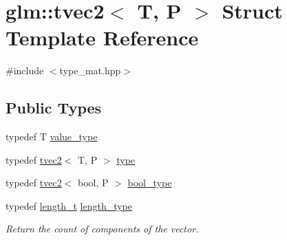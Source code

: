 \hypertarget{structglm_1_1tvec2}{}\section{glm\+::tvec2$<$ T, P $>$ Struct Template Reference}
\label{structglm_1_1tvec2}


{\ttfamily \#include $<$type\+\_\+mat.\+hpp$>$}

\subsection*{Public Types}
\begin{DoxyCompactItemize}
\item 
typedef T \mbox{\hyperlink{structglm_1_1tvec2_a45de6851b3de40183d7e35deb7cb27ab}{value\+\_\+type}}
\item 
typedef \mbox{\hyperlink{structglm_1_1tvec2}{tvec2}}$<$ T, P $>$ \mbox{\hyperlink{structglm_1_1tvec2_a387f2c68c61e26e75bbe3d67ee878f41}{type}}
\item 
typedef \mbox{\hyperlink{structglm_1_1tvec2}{tvec2}}$<$ bool, P $>$ \mbox{\hyperlink{structglm_1_1tvec2_add34b9138a842221f63186e25378d92e}{bool\+\_\+type}}
\item 
typedef \mbox{\hyperlink{namespaceglm_a090a0de2260835bee80e71a702492ed9}{length\+\_\+t}} \mbox{\hyperlink{structglm_1_1tvec2_a5a5ddebab821a3cf9185772386afbe8d}{length\+\_\+type}}
\begin{DoxyCompactList}\small\item\em Return the count of components of the vector. \end{DoxyCompactList}\end{DoxyCompactItemize}
